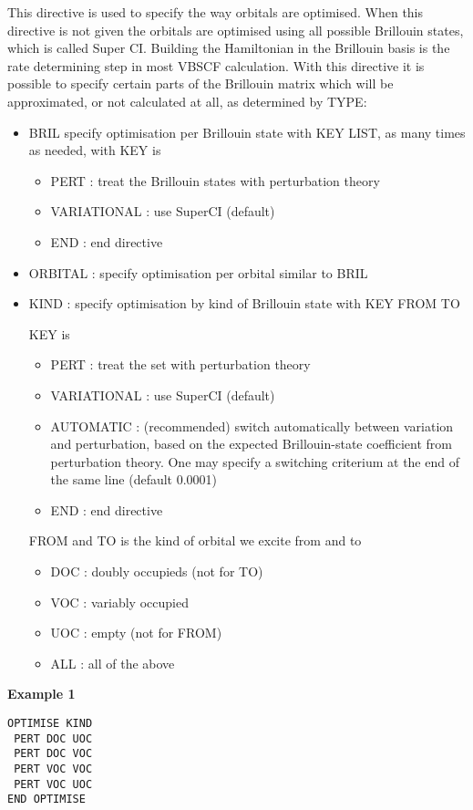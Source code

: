 \documentclass[11pt,fleqn]{article}
\begin{document}
This directive is used to specify the way orbitals are optimised. When this directive is not given
the orbitals are optimised using all possible Brillouin states, which is called Super CI. Building
the Hamiltonian in the Brillouin basis is the rate determining step in most VBSCF calculation. With this
directive it is possible to specify certain parts of the Brillouin matrix which will be approximated,
or not calculated at all, as determined by TYPE:
\begin{itemize}
\item BRIL  specify optimisation per Brillouin state with KEY LIST, as many times as needed,
 with KEY is 
\begin{itemize}
\item PERT : treat the Brillouin states with perturbation theory
\item VARIATIONAL : use SuperCI (default)
\item END   : end directive
\end{itemize}
\item ORBITAL : specify optimisation per orbital similar to BRIL
\item KIND : specify optimisation by kind of Brillouin state with
KEY FROM TO

KEY is
\begin{itemize}
\item PERT : treat the set  with perturbation theory
\item VARIATIONAL : use SuperCI (default)
\item AUTOMATIC : (recommended) switch automatically between variation and perturbation, based on the 
expected Brillouin-state coefficient from perturbation theory. One may specify a switching criterium
 at the end of the same line (default 0.0001)
\item END  :  end directive
\end{itemize}
FROM and TO is the kind of orbital we excite from and to
\begin{itemize}
\item DOC : doubly occupieds (not for TO)
\item VOC : variably occupied
\item UOC : empty (not for FROM)
\item ALL  : all of the above
\end{itemize}
\end{itemize}

{\bf Example 1}
\begin{verbatim}
OPTIMISE KIND
 PERT DOC UOC
 PERT DOC VOC
 PERT VOC VOC
 PERT VOC UOC
END OPTIMISE
\end{verbatim}
\end{document}
